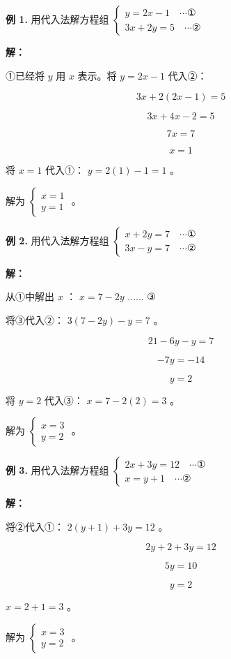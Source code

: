\begin{workedexamples}


\textbf{例 1.} 用代入法解方程组 $\begin{cases} y = 2x - 1 \quad \cdots ① \\ 3x + 2y = 5 \quad \cdots ② \end{cases}$

\textbf{解：}

①已经将 $y$ 用 $x$ 表示。将 $y = 2x - 1$ 代入②：

\[
3x + 2(2x - 1) = 5
\]


\[
3x + 4x - 2 = 5
\]


\[
7x = 7
\]


\[
x = 1
\]


将 $x = 1$ 代入①： $y = 2(1) - 1 = 1$ 。

解为 $\begin{cases} x = 1 \\ y = 1 \end{cases}$ 。

\textbf{例 2.} 用代入法解方程组 $\begin{cases} x + 2y = 7 \quad \cdots ① \\ 3x - y = 7 \quad \cdots ② \end{cases}$

\textbf{解：}

从①中解出 $x$ ： $x = 7 - 2y$ ...... ③

将③代入②： $3(7 - 2y) - y = 7$ 。

\[
21 - 6y - y = 7
\]


\[
-7y = -14
\]


\[
y = 2
\]


将 $y = 2$ 代入③： $x = 7 - 2(2) = 3$ 。

解为 $\begin{cases} x = 3 \\ y = 2 \end{cases}$ 。

\textbf{例 3.} 用代入法解方程组 $\begin{cases} 2x + 3y = 12 \quad \cdots ① \\ x = y + 1 \quad \cdots ② \end{cases}$

\textbf{解：}

将②代入①： $2(y + 1) + 3y = 12$ 。

\[
2y + 2 + 3y = 12
\]


\[
5y = 10
\]


\[
y = 2
\]


$x = 2 + 1 = 3$ 。

解为 $\begin{cases} x = 3 \\ y = 2 \end{cases}$ 。

\end{workedexamples}

